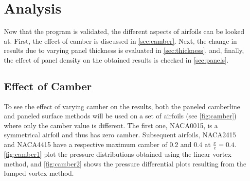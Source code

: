 
\chapter{Analysis}
Now that the program is validated, the different aspects of airfoils can be
looked at. First, the effect of camber is discussed in \autoref{sec:camber}.
Next, the change in results due to varying panel thickness is evaluated in
\autoref{sec:thickness}, and, finally, the effect of panel density on the
obtained results is checked in \autoref{sec:panels}.

\section{Effect of Camber}
\label{sec:camber}
To see the effect of varying camber on the results, both the paneled
camberline and paneled surface methods will be used on a set of
airfoils (see \autoref{fig:camber}) where only the camber value is
different. The first one, NACA0015, is a symmetrical airfoil and thus has zero
camber. Subsequent airfoils, NACA2415 and NACA4415 have a respective
maximum camber of 0.2 and 0.4 at $\frac{x}{c}=0.4$. \autoref{fig:camber1}
plot the pressure distributions obtained using the linear vortex method, and
\autoref{fig:camber2} shows the pressure differential plots resulting from the
lumped vortex method.

